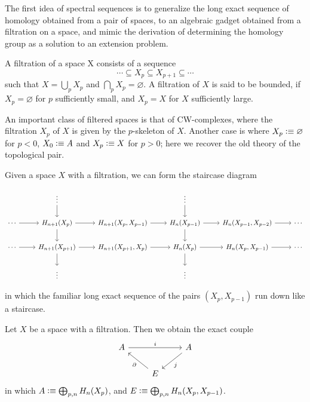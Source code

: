 \documentclass{article}
\begin{document}
The first idea of spectral sequences is to generalize the long exact sequence
of homology obtained from a pair of spaces, to an algebraic gadget obtained from
a filtration on a space, and mimic the derivation of determining the homology
group as a solution to an extension problem.

\begin{defn}
A filtration of a space X consists of a sequence 
\begin{equation*}
\cdots\subseteq X_p\subseteq X_{p+1}\subseteq\cdots
\end{equation*}
such that $X=\bigcup_p X_p$ and $\bigcap_p X_p=\varnothing$. A filtration of $X$ is said to be bounded, if
$X_p=\varnothing$ for $p$ sufficiently small, and $X_p=X$ for $X$ sufficiently
large.
\end{defn}

An important class of filtered spaces is that of CW-complexes, where the filtration
$X_p$ of $X$ is given by the $p$-skeleton of $X$. Another case is where
$X_p\vcentcolon\equiv\varnothing$ for $p<0$, $X_0\vcentcolon\equiv A$ and $X_p\vcentcolon\equiv X$ for $p>0$; here
we recover the old theory of the topological pair.

\begin{defn}
Given a space $X$ with a filtration, we can form the staircase diagram
\begin{footnotesize}
\begin{equation*}
\begin{tikzcd}
& \vdots \arrow[d] & & \vdots \arrow[d] \\ 
\cdots \arrow[r]
& H_{n+1}(X_p) \arrow[r] \arrow[d]
& H_{n+1}(X_p,X_{p-1}) \arrow[r]
& H_n(X_{p-1}) \arrow[r] \arrow[d]
& H_n(X_{p-1},X_{p-2}) \arrow[r]
& \cdots \\
\cdots \arrow[r]
& H_{n+1}(X_{p+1}) \arrow[r] \arrow[d]
& H_{n+1}(X_{p+1},X_{p}) \arrow[r]
& H_n(X_{p}) \arrow[r] \arrow[d]
& H_n(X_{p},X_{p-1}) \arrow[r]
& \cdots \\
& \vdots & & \vdots
\end{tikzcd}
\end{equation*}%
\end{footnotesize}%
in which the familiar long exact sequence of the pairs $(X_p,X_{p-1})$ run
down like a staircase.
\end{defn}

\begin{defn}
Let $X$ be a space with a filtration. Then we obtain the exact couple
\begin{equation*}
\begin{tikzcd}
A \arrow[rr,"i"] & & A \arrow[dl,"j"] \\
& E \arrow[ul,"\partial"]
\end{tikzcd}
\end{equation*}
in which $A\vcentcolon\equiv\bigoplus_{p,n} H_n(X_p)$, and $E\vcentcolon\equiv\bigoplus_{p,n}H_n(X_p,X_{p-1})$. 
\end{defn}
\end{document}
